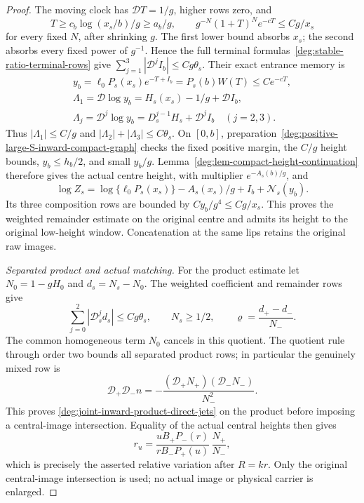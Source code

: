 \begin{proof}
The moving clock has \(\mathcal DT=1/g\), higher rows zero, and
\[
 T\ge c_b\log(x_s/b)/g\ge a_b/g,\qquad
 g^{-N}(1+T)^Ne^{-cT}\le Cg/x_s
\]
for every fixed \(N\), after shrinking \(g\). The first lower bound
absorbs \(x_s\); the second absorbs every fixed power of \(g^{-1}\).
Hence the full terminal formulas~\eqref{deg:stable-ratio-terminal-rows}
give \(\sum_{j=1}^3|\mathcal D^jI_b|\le Cg\theta_s\).
Their exact entrance memory is
\[
 \begin{gathered}
 y_b=\ell_0P_s(x_s)e^{-T+I_b}=P_s(b)W(T)\le Ce^{-cT},\\
 \Lambda_1=\mathcal D\log y_b=H_s(x_s)-1/g+\mathcal DI_b,\\
 \Lambda_j=\mathcal D^j\log y_b=D_s^{j-1}H_s+\mathcal D^jI_b
 \quad(j=2,3).
 \end{gathered}
\]
Thus \(|\Lambda_1|\le C/g\) and
\(|\Lambda_2|+|\Lambda_3|\le C\theta_s\).
On \([0,b]\), preparation~\eqref{deg:positive-large-S-inward-compact-graph}
checks the fixed positive margin, the \(C/g\) height bounds,
\(y_b\le h_b/2\), and small \(y_b/g\).
Lemma~\ref{deg:lem-compact-height-continuation} therefore gives the
actual centre height, with multiplier \(e^{-A_s(b)/g}\), and
\[
 \log Z_s=\log\{\ell_0P_s(x_s)\}-A_s(x_s)/g+I_b+\mathcal N_s(y_b).
\]
Its three composition rows are bounded by \(Cy_b/g^4\le Cg/x_s\).
This proves the weighted remainder estimate on the original centre
and admits its height to the original low-height window. Concatenation
at the same lips retains the original raw images.

\smallskip
\noindent\emph{Separated product and actual matching.}
For the product estimate let \(N_0=1-gH_0\) and \(d_s=N_s-N_0\).
The weighted coefficient and remainder rows give
\[
 \sum_{j=0}^2|\mathcal D_s^jd_s|\le Cg\theta_s,\qquad
 N_s\ge1/2,\qquad
 \varrho=\frac{d_+-d_-}{N_-}.
\]
The common homogeneous term \(N_0\) cancels in this quotient.
The quotient rule through order
two bounds all separated product rows; in particular the genuinely
mixed row is
\[
 \mathcal D_+\mathcal D_-n
 =-\frac{(\mathcal D_+N_+)(\mathcal D_-N_-)}{N_-^2}.
\]
This proves \eqref{deg:joint-inward-product-direct-jets} on the
product before imposing a central-image intersection.
Equality of the actual central heights
then gives
\[
 r_u=\frac{uB_+P_-(r)}{rB_-P_+(u)}\,\frac{N_+}{N_-},
\]
which is precisely the asserted relative variation after \(R=kr\).
Only the original central-image intersection is used; no actual image
or physical carrier is enlarged.
\end{proof}

